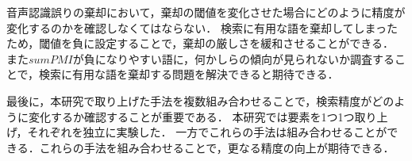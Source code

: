 音声認識誤りの棄却において，棄却の閾値を変化させた場合にどのように精度が変化するのかを確認しなくてはならない．
検索に有用な語を棄却してしまったため，閾値を負に設定することで，棄却の厳しさを緩和させることができる．
また$sumPMI$が負になりやすい語に，何かしらの傾向が見られないか調査することで，検索に有用な語を棄却する問題を解決できると期待できる．

最後に，本研究で取り上げた手法を複数組み合わせることで，検索精度がどのように変化するか確認することが重要である．
本研究では要素を1つ1つ取り上げ，それぞれを独立に実験した．
一方でこれらの手法は組み合わせることができる．これらの手法を組み合わせることで，更なる精度の向上が期待できる．
